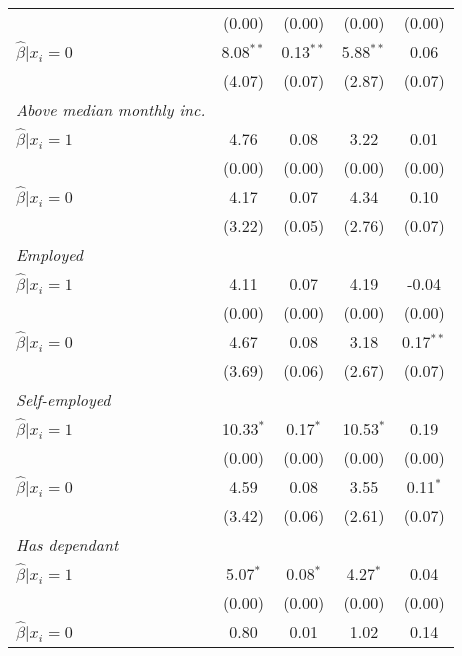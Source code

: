 \begin{table}[htbp]
{\begin{threeparttable}
\begin{tabular}{l*{4}{c}}
                &   (0.00)&   (0.00)&   (0.00)&   (0.00)\\
\hspace{0.5cm} \(\hat\beta|x_i=0\)&8.08$^{**}$&0.13$^{**}$&5.88$^{**}$&     0.06\\
                &   (4.07)&   (0.07)&   (2.87)&   (0.07)\\
\textit{Above median monthly inc.}&         &         &         &         \\
\hspace{0.5cm} \(\hat\beta|x_i=1\)&     4.76&     0.08&     3.22&     0.01\\
                &   (0.00)&   (0.00)&   (0.00)&   (0.00)\\
\hspace{0.5cm} \(\hat\beta|x_i=0\)&     4.17&     0.07&     4.34&     0.10\\
                &   (3.22)&   (0.05)&   (2.76)&   (0.07)\\
\textit{Employed}&         &         &         &         \\
\hspace{0.5cm} \(\hat\beta|x_i=1\)&     4.11&     0.07&     4.19&    -0.04\\
                &   (0.00)&   (0.00)&   (0.00)&   (0.00)\\
\hspace{0.5cm} \(\hat\beta|x_i=0\)&     4.67&     0.08&     3.18&0.17$^{**}$\\
                &   (3.69)&   (0.06)&   (2.67)&   (0.07)\\
\textit{Self-employed}&         &         &         &         \\
\hspace{0.5cm} \(\hat\beta|x_i=1\)&10.33$^{*}$&0.17$^{*}$&10.53$^{*}$&     0.19\\
                &   (0.00)&   (0.00)&   (0.00)&   (0.00)\\
\hspace{0.5cm} \(\hat\beta|x_i=0\)&     4.59&     0.08&     3.55&0.11$^{*}$\\
                &   (3.42)&   (0.06)&   (2.61)&   (0.07)\\
\textit{Has dependant}&         &         &         &         \\
\hspace{0.5cm} \(\hat\beta|x_i=1\)&5.07$^{*}$&0.08$^{*}$&4.27$^{*}$&     0.04\\
                &   (0.00)&   (0.00)&   (0.00)&   (0.00)\\
\hspace{0.5cm} \(\hat\beta|x_i=0\)&     0.80&     0.01&     1.02&     0.14\\

\end{tabular}
\end{threeparttable}}
\end{table}
